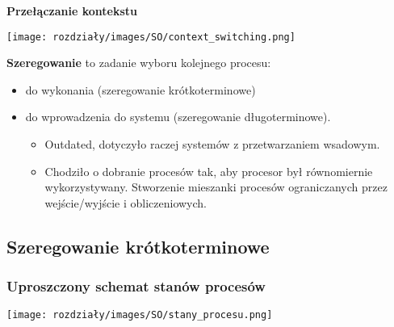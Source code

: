 \textbf{Przełączanie kontekstu}
\begin{center}
    \texttt{[image: rozdziały/images/SO/context\_switching.png]}
\end{center}

\textbf{Szeregowanie} to zadanie wyboru kolejnego procesu:
\begin{itemize}
    \item do wykonania (szeregowanie krótkoterminowe)
    \item do wprowadzenia do systemu (szeregowanie długoterminowe). 
        \begin{itemize}
            \item Outdated, dotyczyło raczej systemów z przetwarzaniem wsadowym.
            \item Chodziło o dobranie procesów tak, aby procesor był równomiernie wykorzystywany. Stworzenie mieszanki procesów ograniczanych przez wejście/wyjście i obliczeniowych. 
        \end{itemize}
\end{itemize}

\subsection{Szeregowanie krótkoterminowe}
    \subsubsection{Uproszczony schemat stanów procesów}   
        \begin{center}
            \texttt{[image: rozdziały/images/SO/stany\_procesu.png]}
        \end{center}


